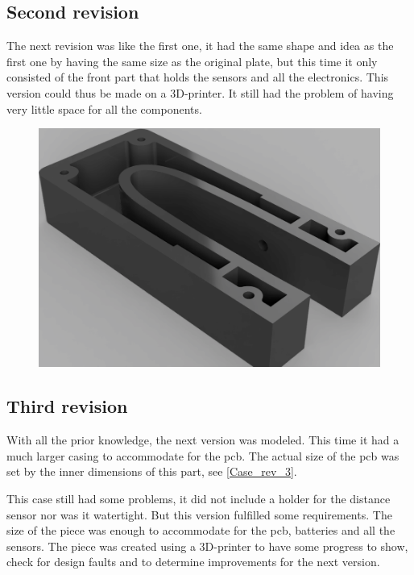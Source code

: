 \subsection{Second revision}
The next revision was like the first one, it had the same shape and idea as the first one by having the same size as the original plate, but this time it only consisted of the front part that holds the sensors and all the electronics. This version could thus be made on a 3D-printer. It still had the problem of having very little space for all the components.

\begin{figure}[H]
\begin{center}
	\includegraphics[width = .8\textwidth]{Figures/Case_rev_2.png}
	\label{Case_rev_2}
\end{center}
\end{figure}

\subsection{Third revision}
With all the prior knowledge, the next version was modeled. This time it had a much larger casing to accommodate for the \gls{pcb}. The actual size of the \gls{pcb} was set by the inner dimensions of this part, see \autoref{Case_rev_3}.

This case still had some problems, it did not include a holder for the distance sensor nor was it watertight. But this version fulfilled some requirements. The size of the piece was enough to accommodate for the \gls{pcb}, batteries and all the sensors. The piece was created using a 3D-printer to have some progress to show, check for design faults and to determine improvements for the next version.

